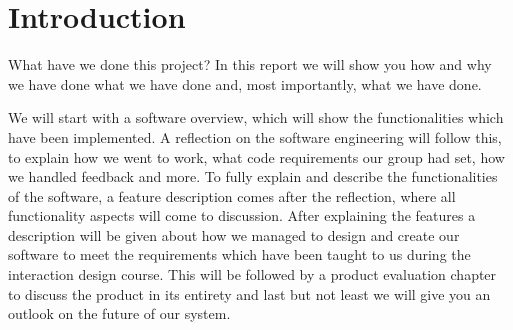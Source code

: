 \chapter{Introduction} %

What have we done this project? In this report we will show you how and why we have done what we have done and, most importantly, what we have done.

We will start with a software overview, which will show the functionalities which have been implemented. A reflection on the software engineering will follow this, to explain how we went to work, what code requirements our group had set, how we handled feedback and more. To fully explain and describe the functionalities of the software, a feature description comes after the reflection, where all functionality aspects will come to discussion. After explaining the features a description will be given about how we managed to design and create our software to meet the requirements which have been taught to us during the interaction design course. This will be followed by a product evaluation chapter to discuss the product in its entirety and last but not least we will give you an outlook on the future of our system. 